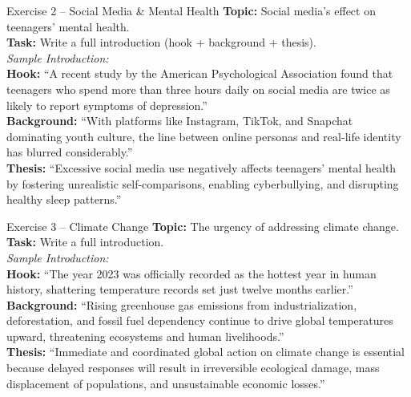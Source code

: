\documentclass[12pt,a4paper]{article}
\begin{document}
\begin{practicebox}{Exercise 2 -- Social Media \& Mental Health}
\textbf{Topic:} Social media's effect on teenagers' mental health.\\
\textbf{Task:} Write a full introduction (hook + background + thesis).\\[0.3cm]
\textit{Sample Introduction:}\\
\textbf{Hook:} ``A recent study by the American Psychological Association found that teenagers who spend more than three hours daily on social media are twice as likely to report symptoms of depression.''\\
\textbf{Background:} ``With platforms like Instagram, TikTok, and Snapchat dominating youth culture, the line between online personas and real-life identity has blurred considerably.''\\
\textbf{Thesis:} ``Excessive social media use negatively affects teenagers' mental health by fostering unrealistic self-comparisons, enabling cyberbullying, and disrupting healthy sleep patterns.''
\end{practicebox}

\begin{practicebox}{Exercise 3 -- Climate Change}
\textbf{Topic:} The urgency of addressing climate change.\\
\textbf{Task:} Write a full introduction.\\[0.3cm]
\textit{Sample Introduction:}\\
\textbf{Hook:} ``The year 2023 was officially recorded as the hottest year in human history, shattering temperature records set just twelve months earlier.''\\
\textbf{Background:} ``Rising greenhouse gas emissions from industrialization, deforestation, and fossil fuel dependency continue to drive global temperatures upward, threatening ecosystems and human livelihoods.''\\
\textbf{Thesis:} ``Immediate and coordinated global action on climate change is essential because delayed responses will result in irreversible ecological damage, mass displacement of populations, and unsustainable economic losses.''
\end{practicebox}
\end{document}
